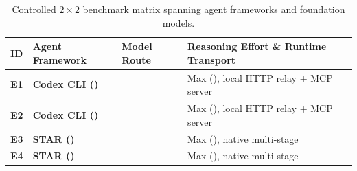 \begin{table}[htbp]
\centering
\caption{Controlled $2 \times 2$ benchmark matrix spanning agent frameworks and foundation models.}
\label{tab:matrix}
\footnotesize
\begin{tabularx}{\textwidth}{@{}llL{0.28\textwidth}Y@{}}
\toprule
\textbf{ID} & \textbf{Agent Framework} & \textbf{Model Route} & \textbf{Reasoning Effort \& Runtime Transport} \\
\midrule
\textbf{E1} & \textbf{Codex CLI ()} &  & Max (), local  HTTP relay + MCP server \\
\textbf{E2} & \textbf{Codex CLI ()} &  & Max (), local  HTTP relay + MCP server \\
\textbf{E3} & \textbf{STAR ()} &  & Max (), native multi-stage  \\
\textbf{E4} & \textbf{STAR ()} &  & Max (), native multi-stage  \\
\bottomrule
\end{tabularx}
\end{table}

